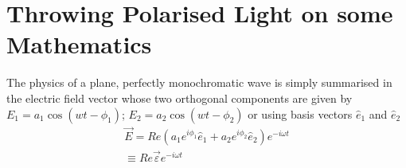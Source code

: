 \chapter[Throwing Polarised Light on some Mathematics]{Throwing Polarised Light on some Mathematics}\label{chap13}


The physics of a plane, perfectly monochromatic wave is simply summarised
in the electric field vector whose two orthogonal components are given by
$E_1 = a_1 \cos(wt - \phi_1)$; $E_2 = a_2 \cos(wt - \phi_2)$ or using basis vectors $\hat{e}_1$ and $\hat{e}_2$
\begin{gather*}
\overrightarrow{E} = Re (a_1 e^{i \phi_1 } \hat{e}_1 + a_2 e^{i\phi_2} \hat{e}_2 ) e^{-i\omega t} \\
\equiv Re \overrightarrow{\varepsilon} e^{-i\omega t}
\end{gather*}

